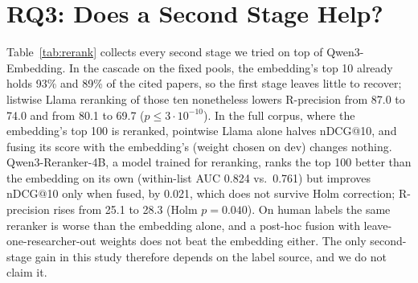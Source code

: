 \documentclass[sigconf,nonacm]{acmart}
\begin{document}
\section{RQ3: Does a Second Stage Help?}
\label{sec:rq3}
Table~\ref{tab:rerank} collects every second stage we tried on top of Qwen3-Embedding.
In the cascade on the fixed pools, the embedding's top 10 already holds 93\% and 89\% of the cited papers, so the first stage leaves little to recover; listwise Llama reranking of those ten nonetheless lowers R-precision from 87.0 to 74.0 and from 80.1 to 69.7 ($p \le 3 \cdot 10^{-10}$).
In the full corpus, where the embedding's top 100 is reranked, pointwise Llama alone halves nDCG@10, and fusing its score with the embedding's (weight chosen on dev) changes nothing.
Qwen3-Reranker-4B, a model trained for reranking, ranks the top 100 better than the embedding on its own (within-list AUC 0.824 vs.\ 0.761) but improves nDCG@10 only when fused, by 0.021, which does not survive Holm correction; R-precision rises from 25.1 to 28.3 (Holm $p = 0.040$).
On human labels the same reranker is worse than the embedding alone, and a post-hoc fusion with leave-one-researcher-out weights does not beat the embedding either.
The only second-stage gain in this study therefore depends on the label source, and we do not claim it.
\end{document}
